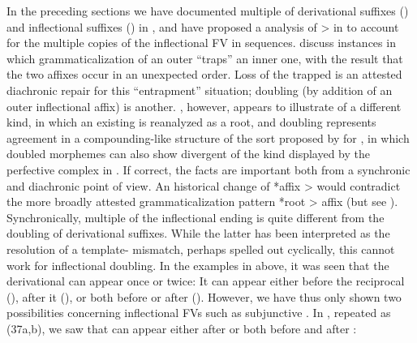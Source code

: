 \documentclass[output=paper,
modfonts
]{LSP/langsci}
\begin{document}
In the preceding sections we have documented multiple  of
derivational suffixes () and inflectional suffixes () in , and
have proposed a  analysis of  \textgreater{}
 in  to account for the multiple copies of the
inflectional FV in  sequences. \citet{harris2006}
discuss instances in which grammaticalization of an outer 
``traps'' an inner one, with the result that the two affixes occur in an
unexpected order. Loss of the trapped  is an attested diachronic
repair for this ``entrapment'' situation; doubling (by addition of an
outer inflectional affix) is another. , however, appears to
illustrate  of a different kind, in which an existing  is
reanalyzed as a root, and doubling represents agreement in a
compounding-like structure of the sort proposed by \citet{inkelas2005} for , in which doubled morphemes can also show
divergent  of the kind displayed by the perfective complex in
. If correct, the  facts are important both from a
synchronic and diachronic point of view. An historical change of *affix
\textgreater{}  would contradict the more broadly attested
grammaticalization pattern *root \textgreater{} affix (but see \citealt{norde2009}). Synchronically, multiple  of the inflectional ending is
quite different from the doubling of derivational suffixes. While the
latter has been interpreted as the resolution of a template-
mismatch, perhaps spelled out cyclically, this cannot work for
inflectional doubling. In the examples in  above, it was seen that
the derivational   can appear once or twice: It can
appear either before the reciprocal (), after it
(), or both before or after (). However,
we have thus only shown two possibilities concerning inflectional FVs
such as subjunctive . In , repeated as (37a,b), we saw that
 can appear either after  or both before and after
:
\end{document}
